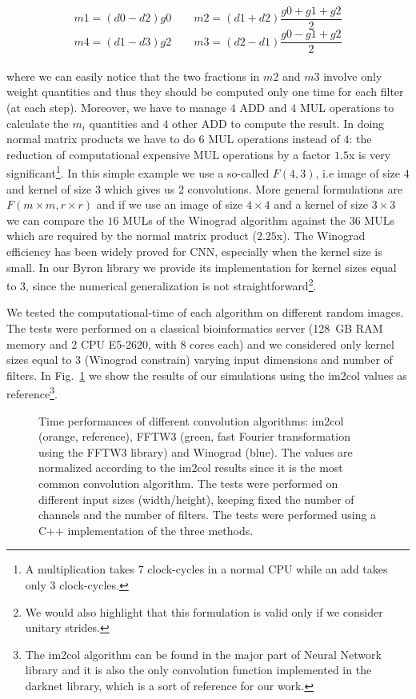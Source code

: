 \documentclass{standalone}
\begin{document}
$$
m1 = (d0 - d2)g0\quad\quad m2 = (d1 + d2)\frac{g0 + g1 + g2}{2}
$$
$$
m4 = (d1 - d3)g2\quad\quad m3 = (d2 - d1)\frac{g0 - g1 + g2}{2}
$$
\\
where we can easily notice that the two fractions in $m2$ and $m3$ involve only weight quantities and thus they should be computed only one time for each filter (at each step).
Moreover, we have to manage $4$ \textsf{ADD} and $4$ \textsf{MUL} operations to calculate the $m_i$ quantities and $4$ other ADD to compute the result.
In doing normal matrix products we have to do $6$ \textsf{MUL} operations instead of $4$: the reduction of computational expensive \textsf{MUL} operations by a factor $1.5$x is very significant\footnote{
  A multiplication takes $7$ clock-cycles in a normal CPU while an add takes only $3$ clock-cycles.
}.
In this simple example we use a so-called $F(4, 3)$, i.e image of size $4$ and kernel of size $3$ which gives us $2$ convolutions.
More general formulations are $F(m\times m, r \times r)$ and if we use an image of size $4\times4$ and a kernel of size $3\times3$ we can compare the $16$ \textsf{MUL}s of the \textsf{Winograd} algorithm against the $36$ \textsf{MUL}s which are required by the normal matrix product ($2.25$x).
The \textsf{Winograd} efficiency has been widely proved for CNN, especially when the kernel size is small.
In our \textsf{Byron} library we provide its implementation for kernel sizes equal to $3$, since the numerical generalization is not straightforward\footnote{
  We would also highlight that this formulation is valid only if we consider unitary strides.
}.

We tested the computational-time of each algorithm on different random images.
The tests were performed on a classical bioinformatics server (128~GB RAM memory and 2 CPU E5-2620, with 8 cores each) and we considered only kernel sizes equal to $3$ (\textsf{Winograd} constrain) varying input dimensions and number of filters.
In Fig.~\ref{fig:winograd_timing} we show the results of our simulations using the \textsf{im2col} values as reference\footnote{
  The \textsf{im2col} algorithm can be found in the major part of Neural Network library and it is also the only convolution function implemented in the \textsf{darknet} library, which is a sort of reference for our work.
}.

\begin{figure}[htbp]
\centering
\def\svgwidth{0.8\textwidth}

\caption{Time performances of different convolution algorithms: \textsf{im2col} (orange, reference), \textsf{FFTW3} (green, fast Fourier transformation using the \textsf{FFTW3} library) and \textsf{Winograd} (blue).
The values are normalized according to the \textsf{im2col} results since it is the most common convolution algorithm.
The tests were performed on different input sizes (width/height), keeping fixed the number of channels and the number of filters.
The tests were performed using a \textsf{C++} implementation of the three methods.
}
\label{fig:winograd_timing}
\end{figure}
\end{document}
